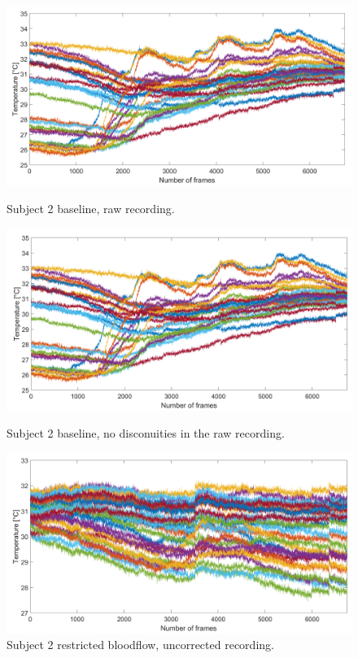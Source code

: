 \begin{figure}[htbp]
	\begin{minipage}[b]{0.45\linewidth}
		\centering
		\includegraphics[width=\linewidth]{figures/Recordings/Sub2_uncuffed_uncorr}
		\caption{Subject 2 baseline, raw recording.}

	\end{minipage}
	\hspace{0.2cm}
	\begin{minipage}[b]{0.45\linewidth}
		\centering
		\includegraphics[width=\linewidth]{figures/Recordings/Sub2_uncuffed_corr-no_jumps}
		\caption{Subject 2  baseline, no disconuities in the raw recording.}
		
	\end{minipage}
	\hspace{0.2cm}
	\begin{minipage}[b]{0.45\linewidth}
		\centering
		\includegraphics[width=\linewidth]{figures/Recordings/Sub2_cuffed_uncorr}
		\caption{Subject 2 restricted bloodflow, uncorrected recording.}
	

\end{minipage}
\end{figure}
